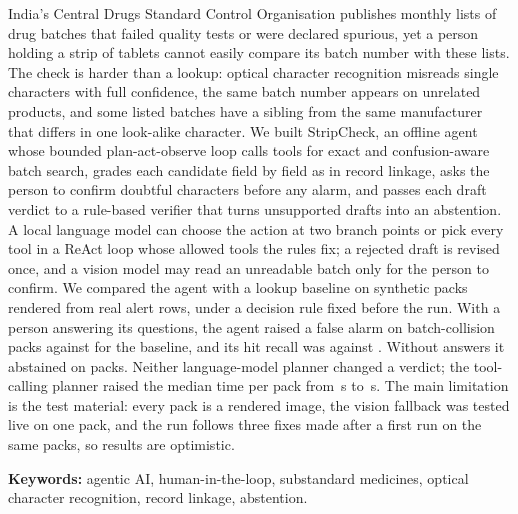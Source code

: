 India's Central Drugs Standard Control Organisation publishes monthly lists of drug batches that
failed quality tests or were declared spurious, yet a person holding a strip of tablets cannot easily compare its batch number with these lists. The check is harder than a lookup: optical character recognition misreads single characters with full confidence, the
same batch number appears on unrelated products, and some listed batches have a sibling from the
same manufacturer that differs in one look-alike character. We built StripCheck, an offline agent whose bounded plan-act-observe loop calls tools for
exact and confusion-aware batch search, grades each candidate field by field as in record linkage,
asks the person to confirm doubtful characters before any alarm, and passes each draft verdict to a
rule-based verifier that turns unsupported drafts into an abstention. A local language model can choose the action at two
branch points or pick every tool in a ReAct loop whose allowed tools the rules fix; a rejected draft is revised once, and a
vision model may read an unreadable batch only for the person to confirm. We
compared the agent with a lookup baseline on  synthetic packs rendered from real alert rows, under a decision rule fixed before the run. With a person answering its questions, the agent raised a false alarm on 
batch-collision packs against  for the baseline, and its hit recall was
 against . Without answers it abstained on
 packs. Neither language-model planner changed a verdict; the tool-calling planner raised the
median time per pack from \,s to \,s. The main limitation is the test
material: every pack is a rendered image, the vision fallback was tested live on one pack, and the run follows three fixes
made after a first run on the same packs, so results are optimistic.

\medskip
\noindent\textbf{Keywords:} agentic AI, human-in-the-loop, substandard medicines, optical character
recognition, record linkage, abstention.
